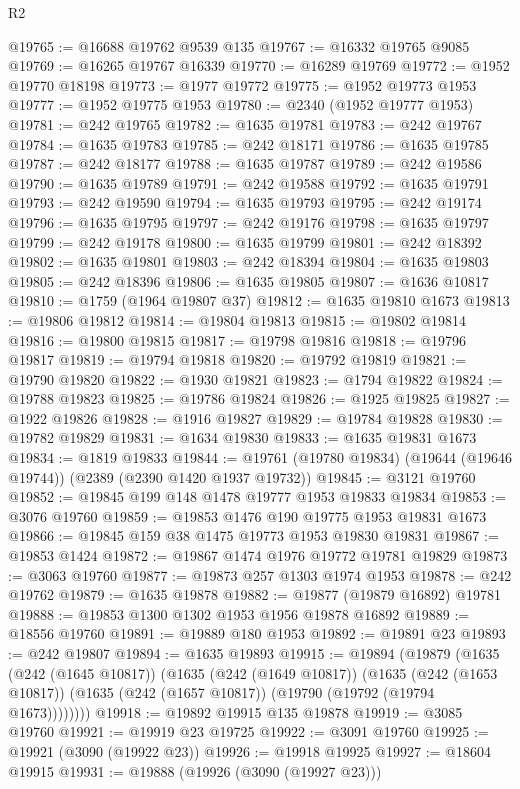 \begin{lexlean}{R2}
\begin{coremodule}
@19765 := @16688 @19762 @9539 @135
@19767 := @16332 @19765 @9085
@19769 := @16265 @19767 @16339
@19770 := @16289 @19769
@19772 := @1952 @19770 @18198
@19773 := @1977 @19772
@19775 := @1952 @19773 @1953
@19777 := @1952 @19775 @1953
@19780 := @2340 (@1952 @19777 @1953)
@19781 := @242 @19765
@19782 := @1635 @19781
@19783 := @242 @19767
@19784 := @1635 @19783
@19785 := @242 @18171
@19786 := @1635 @19785
@19787 := @242 @18177
@19788 := @1635 @19787
@19789 := @242 @19586
@19790 := @1635 @19789
@19791 := @242 @19588
@19792 := @1635 @19791
@19793 := @242 @19590
@19794 := @1635 @19793
@19795 := @242 @19174
@19796 := @1635 @19795
@19797 := @242 @19176
@19798 := @1635 @19797
@19799 := @242 @19178
@19800 := @1635 @19799
@19801 := @242 @18392
@19802 := @1635 @19801
@19803 := @242 @18394
@19804 := @1635 @19803
@19805 := @242 @18396
@19806 := @1635 @19805
@19807 := @1636 @10817
@19810 := @1759 (@1964 @19807 @37)
@19812 := @1635 @19810 @1673
@19813 := @19806 @19812
@19814 := @19804 @19813
@19815 := @19802 @19814
@19816 := @19800 @19815
@19817 := @19798 @19816
@19818 := @19796 @19817
@19819 := @19794 @19818
@19820 := @19792 @19819
@19821 := @19790 @19820
@19822 := @1930 @19821
@19823 := @1794 @19822
@19824 := @19788 @19823
@19825 := @19786 @19824
@19826 := @1925 @19825
@19827 := @1922 @19826
@19828 := @1916 @19827
@19829 := @19784 @19828
@19830 := @19782 @19829
@19831 := @1634 @19830
@19833 := @1635 @19831 @1673
@19834 := @1819 @19833
@19844 := @19761 (@19780 @19834) (@19644 (@19646 @19744)) (@2389 (@2390 @1420 @1937 @19732))
@19845 := @3121 @19760
@19852 := @19845 @199 @148 @1478 @19777 @1953 @19833 @19834
@19853 := @3076 @19760
@19859 := @19853 @1476 @190 @19775 @1953 @19831 @1673
@19866 := @19845 @159 @38 @1475 @19773 @1953 @19830 @19831
@19867 := @19853 @1424
@19872 := @19867 @1474 @1976 @19772 @19781 @19829
@19873 := @3063 @19760
@19877 := @19873 @257 @1303 @1974 @1953
@19878 := @242 @19762
@19879 := @1635 @19878
@19882 := @19877 (@19879 @16892) @19781
@19888 := @19853 @1300 @1302 @1953 @1956 @19878 @16892
@19889 := @18556 @19760
@19891 := @19889 @180 @1953
@19892 := @19891 @23
@19893 := @242 @19807
@19894 := @1635 @19893
@19915 := @19894
    (@19879
      (@1635
        (@242 (@1645 @10817))
        (@1635
          (@242 (@1649 @10817))
          (@1635
            (@242 (@1653 @10817))
            (@1635 (@242 (@1657 @10817)) (@19790 (@19792 (@19794 @1673))))))))
@19918 := @19892 @19915 @135 @19878
@19919 := @3085 @19760
@19921 := @19919 @23 @19725
@19922 := @3091 @19760
@19925 := @19921 (@3090 (@19922 @23))
@19926 := @19918 @19925
@19927 := @18604 @19915
@19931 := @19888 (@19926 (@3090 (@19927 @23)))

\end{coremodule}
\end{lexlean}
